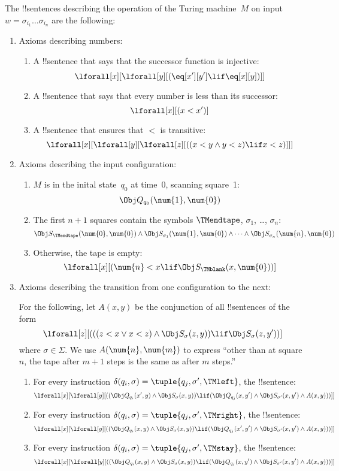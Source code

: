 \documentclass[../../../include/open-logic-section]{subfiles}
\begin{document}
The !!{sentence}s describing the operation of the Turing machine~$M$ on
input $w = \sigma_{i_1}\dots\sigma_{i_n}$ are the following:
\begin{enumerate}
\item Axioms describing numbers:
\begin{enumerate}
\item A !!{sentence} that says that the successor function is injective:
\[
\lforall[x][\lforall[y][
    (\eq[x'][y'] \lif \eq[x][y])]]
\]
\item A !!{sentence} that says that every number is less than its successor:
\[
\lforall[x][(x < x')]
\]
\item A !!{sentence} that ensures that $<$ is transitive:
\[
\lforall[x][\lforall[y][\lforall[z][
      ((x < y \land y < z) \lif x < z)]]]
\]
\end{enumerate}
\item Axioms describing the input configuration:
\begin{enumerate}
\item $M$ is in the inital state~$q_0$ at time~0, scanning square~1:
\[
\Obj Q_{q_0}(\num{1}, \num{0})
\]
\item The first $n+1$ squares contain the symbols $\TMendtape$,
  $\sigma_{1}$, \dots, $\sigma_{n}$:
\[
\Obj S_\TMendtape(\num{0}, \num{0}) \land
\Obj S_{\sigma_1}(\num{1}, \num{0}) \land
\dots \land
\Obj S_{\sigma_n}(\num{n}, \num{0})
\]
\item Otherwise, the tape is empty:
\[
\lforall[x][(\num{n} < x \lif \Obj S_\TMblank(x, \num{0}))]
\]
\end{enumerate}
\item Axioms describing the transition from one configuration to
  the next:

For the following, let $A(x, y)$ be the conjunction of all !!{sentence}s
of the form
\[
\lforall[z][
  (((z < x \lor x < z) \land \Obj S_\sigma(z, y))
  \lif \Obj S_\sigma(z, y'))]
\]
where $\sigma \in \Sigma$.  We use $A(\num{n},\num{m})$ to express
``other than at square~$n$, the tape after $m+1$ steps is the same as
after $m$ steps.''
\begin{enumerate}
\item For every instruction $\delta(q_i, \sigma) = \tuple{q_j,
  \sigma', \TMleft}$, the !!{sentence}:
\[
\lforall[x][\lforall[y][
    ((\Obj Q_{q_i}(x', y) \land \Obj S_{\sigma}(x, y)) \lif
   (\Obj Q_{q_j}(x, y') \land \Obj S_{\sigma'}(x, y') \land
A(x, y)))]]
\]
\item For every instruction $\delta(q_i, \sigma) = \tuple{q_j,
  \sigma', \TMright}$, the !!{sentence}:
\[
\lforall[x][\lforall[y][(
   (\Obj Q_{q_i}(x, y) \land \Obj S_{\sigma}(x, y)) \lif
   (\Obj Q_{q_j}(x', y') \land \Obj S_{\sigma'}(x, y') \land
A(x, y)))]]
\]
\item For every instruction $\delta(q_i, \sigma) = \tuple{q_j,
  \sigma', \TMstay}$, the !!{sentence}:
\[
\lforall[x][\lforall[y][(
   (\Obj Q_{q_i}(x, y) \land \Obj S_{\sigma}(x, y)) \lif
   (\Obj Q_{q_j}(x, y') \land \Obj S_{\sigma'}(x, y') \land
A(x, y)))]]
\]
\end{enumerate}
\end{enumerate}
\end{document}
